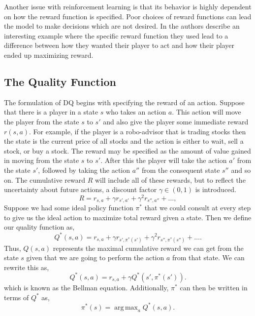 \documentclass[%
 reprint,
nofootinbib,
 amsmath,amssymb,
 aps,
]{revtex4-1}
\DeclareMathOperator*{\argmax}{arg\,max}
\begin{document}
Another issue with reinforcement learning is that its behavior is highly dependent on how the reward function is specified. Poor choices of reward functions can lead the model to make decisions which are not desired. In \cite{clark_amodei_2017} the authors describe an interesting example where the specific reward function they used lead to a difference between how they wanted their player to act and how their player ended up maximizing reward.

\subsection{\label{sec:QualityFunction}The Quality Function}
 The formulation of DQ begins with specifying the reward of an action. Suppose that there is a player in a state $s$ who takes an action $a$. This action will move the player from the state $s$ to $s'$ and also give the player some immediate reward $r(s,a)$. For example, if the player is a robo-advisor that is trading stocks then the state is the current price of all stocks and the action is either to wait, sell a stock, or buy a stock. The reward may be specified as the amount of value gained in moving from the state $s$ to $s'$. After this the player will take the action $a'$ from the state $s'$, followed by taking the action $a''$ from the consequent state $s''$ and so on. The cumulative reward $R$ will include all of these rewards, but to reflect the uncertainty about future actions, a discount factor $\gamma\in(0,1)$ is introduced.
\begin{equation}
  R =  r_{s,a} + \gamma r_{s',a'} + \gamma^2 r_{s'',a''} + \hdots, \label{eq:CumulativeReward}
\end{equation}
Suppose we had some ideal policy function $\pi^*$ that we could consult at every step to give us the ideal action to maximize total reward given a state. Then we define our quality function as,
\begin{equation}
  Q^*(s,a) = r_{s,a} + \gamma r_{s',\pi^*(s')} + \gamma^2 r_{s'',\pi^*(s'')} + \hdots. \label{eq:Bellman1}
\end{equation}
Thus, $Q(s,a)$ represents the maximal cumulative reward we can get from the state $s$ given that we are going to perform the action $a$ from that state. We can rewrite this as,
\begin{equation}
  Q^*(s,a) = r_{s,a} + \gamma Q^*(s', \pi^*(s')). \label{eq:Bellman2}
\end{equation}
which is known as the Bellman equation. Additionally, $\pi^*$ can then be written in terms of $Q^*$ as,
\begin{equation}
  \pi^*(s) = \argmax_a Q^*(s,a). \label{eq:Policy1}
\end{equation}
\end{document}
